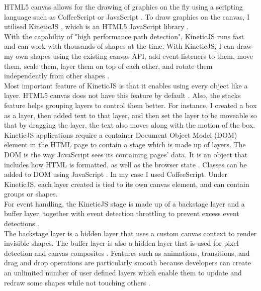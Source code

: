 \documentclass[titlepage,a4paper,11pt]{report}
\begin{document}
\indent HTML5 canvas allows for the drawing of graphics on the fly using a scripting language such as CoffeeScript or JavaScript \citep{w3}. To draw graphics on the canvas, I utilised KineticJS , which is an HTML5 JavaScript library \citep{kjs}.\\

\indent With the capability of "high performance path detection", KineticJS runs fast and can work with thousands of shapes at the time. With KineticJS, I can draw my own shapes using the existing canvas API, add event listeners to them, move them, scale them, layer them on top of each other, and rotate them independently from other shapes \citep{gary}. \\

\indent Most important feature of KineticJS is that it enables using every object like a layer. HTML5 canvas does not have this feature by default \citep{gary}. Also, the stacks feature helps grouping layers to control them better. For instance, I created a box as a layer, then added text to that layer, and then set the layer to be moveable so that by dragging the layer, the text also moves along with the motion of the box.\\

\indent KineticJS applications require a container Document Object Model (DOM) element in the HTML page to contain a stage which is made up of layers. The DOM is the way JavaScript sees its containing pages' data. It is an object that includes how HTML is formatted, as well as the browser state \citep{w3}. Classes can be added to DOM using JavaScript \citep{gary}. In my case I used CoffeeScript. Under KineticJS, each layer created is tied to its own canvas element, and can contain groups or shapes.\\

\indent For event handling, the KineticJS stage is made up of a backstage layer and a buffer layer, together with event detection throttling to prevent excess event detections \citep{kjs}.\\

\indent The backstage layer is a hidden layer that uses a custom canvas context to render invisible shapes. The buffer layer is also a hidden layer that is used for pixel detection and canvas composites \citep{kjs}. Features such as animations, transitions, and drag and drop operations are particularly smooth because developers can create an unlimited number of user defined layers which enable them to update and redraw some shapes while not touching others \citep{gary}.\\
\end{document}
